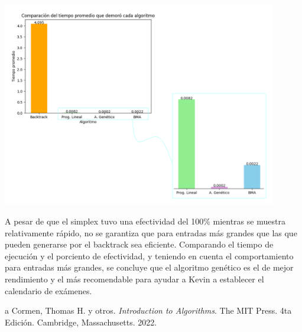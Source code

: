 \documentclass[10pt]{article} %
\begin{document}
    \begin{center}
    	\includegraphics[width=12cm]{Bar_comparative_plot.png}
    \end{center}
	
	A pesar de que el simplex tuvo una efectividad del 100\% mientras se muestra relativamente r\'apido, no se garantiza que para entradas m\'as grandes que las que pueden generarse por el backtrack sea eficiente. Comparando el tiempo de ejecuci\'on y el porciento de efectividad, y teniendo en cuenta el comportamiento para entradas m\'as grandes, se concluye que el algoritmo gen\'etico es el de mejor rendimiento y el m\'as recomendable para ayudar a Kevin a establecer el calendario de ex\'amenes.
	
	\begin{thebibliography}
		a
		 Cormen, Thomas H. y otros. \emph{Introduction to Algorithms}. 
		The MIT Press.
		4ta Edici\'on.		
		Cambridge, Massachusetts.
		2022.
	\end{thebibliography}
\end{document}
